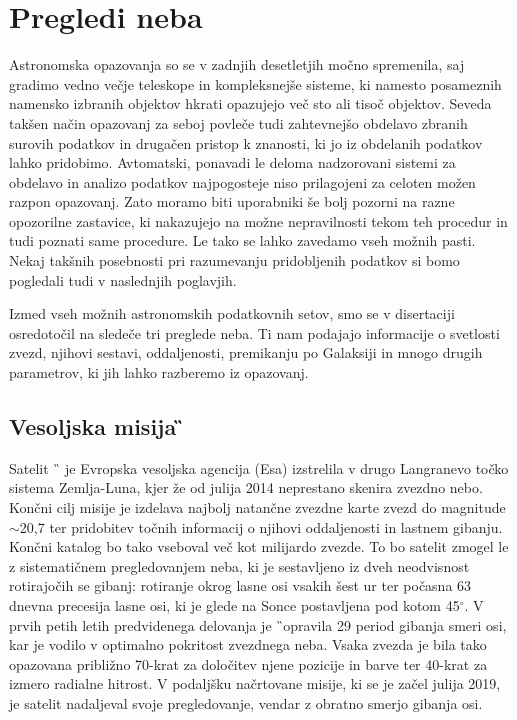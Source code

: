 \section{Pregledi neba}
\label{sec:slo_pregledi}
Astronomska opazovanja so se v zadnjih desetletjih močno spremenila, saj gradimo vedno večje teleskope in kompleksnejše sisteme, ki namesto posameznih namensko izbranih objektov hkrati opazujejo več sto ali tisoč objektov. Seveda takšen način opazovanj za seboj povleče tudi zahtevnejšo obdelavo zbranih surovih podatkov in drugačen pristop k znanosti, ki jo iz obdelanih podatkov lahko pridobimo. Avtomatski, ponavadi le deloma nadzorovani sistemi za obdelavo in analizo podatkov najpogosteje niso prilagojeni za celoten možen razpon opazovanj. Zato moramo biti uporabniki še bolj pozorni na razne opozorilne zastavice, ki nakazujejo na možne nepravilnosti tekom teh procedur in tudi poznati same procedure. Le tako se lahko zavedamo vseh možnih pasti. Nekaj takšnih posebnosti pri razumevanju pridobljenih podatkov si bomo pogledali tudi v naslednjih poglavjih.

Izmed vseh možnih astronomskih podatkovnih setov, smo se v disertaciji osredotočil na sledeče tri preglede neba. Ti nam podajajo informacije o svetlosti zvezd, njihovi sestavi, oddaljenosti, premikanju po Galaksiji in mnogo drugih parametrov, ki jih lahko razberemo iz opazovanj.

\subsection{Vesoljska misija \G}
\label{sec:slo_gaia}
Satelit \G\ \cite{2016A&A...595A...1G} je Evropska vesoljska agencija (Esa) izstrelila v drugo Langranevo točko sistema Zemlja-Luna, kjer že od julija 2014 neprestano skenira zvezdno nebo. Končni cilj misije je izdelava najbolj natančne zvezdne karte zvezd do magnitude $\sim$20,7 ter pridobitev točnih informacij o njihovi oddaljenosti in lastnem gibanju. Končni katalog bo tako vseboval več kot milijardo zvezde. To bo satelit zmogel le z sistematičnem pregledovanjem neba, ki je sestavljeno iz dveh neodvisnost rotirajočih se gibanj: rotiranje okrog lasne osi vsakih šest ur ter počasna 63 dnevna precesija lasne osi, ki je glede na Sonce postavljena pod kotom 45$^\circ$. V prvih petih letih predvidenega delovanja je \G\ opravila 29 period gibanja smeri osi, kar je vodilo v optimalno pokritost zvezdnega neba. Vsaka zvezda je bila tako opazovana približno 70-krat za določitev njene pozicije in barve ter 40-krat za izmero radialne hitrost. V podaljšku načrtovane misije, ki se je začel julija 2019, je satelit nadaljeval svoje pregledovanje, vendar z obratno smerjo gibanja osi.

